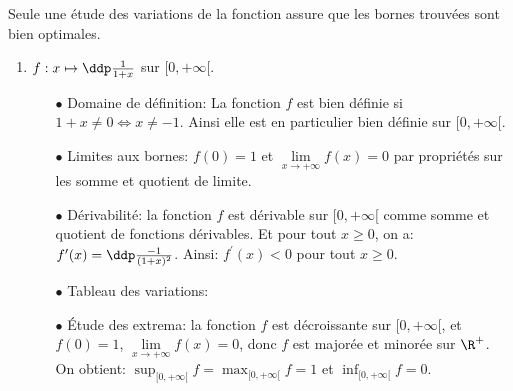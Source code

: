 \begin{correction}  \;
Seule une \'etude des variations de la fonction assure que les bornes trouv\'ees sont bien optimales.
\begin{enumerate}
 \item $f: x\mapsto \ddp\frac{1}{1+x}  $ sur $\lbrack 0,+\infty\lbrack$.
\begin{itemize}
\item[$\bullet$] Domaine de d\'efinition: La fonction $f$ est bien d\'efinie si $1+x\not=0\Leftrightarrow x\not= -1$. Ainsi elle est en particulier bien d\'efinie sur $\lbrack 0,+\infty\lbrack$.
\item[$\bullet$] Limites aux bornes: $f(0)=1$ et $\lim\limits_{x\to +\infty} f(x)=0$ par propri\'et\'es sur les somme et quotient de limite.
\item[$\bullet$] D\'erivabilit\'e: la fonction $f$ est d\'erivable sur $\lbrack 0,+\infty\lbrack$ comme somme et quotient de fonctions d\'erivables. Et pour tout $x\geq 0$, on a: $f^{\prime}(x)=\ddp\frac{-1}{(1+x)^2}$. Ainsi: $f^{\prime}(x)<0$ pour tout $x\geq 0$. 
\item[$\bullet$] Tableau des variations:
\begin{center}
\end{center}
\item[$\bullet$] \'Etude des extrema: la fonction $f$ est d\'ecroissante sur $[0,+\infty[$, et $f(0)=1$, $\lim\limits_{x\to +\infty} f(x)=0$, donc $f$ est major\'ee et minor\'ee sur $\R^+$. On obtient: $\sup_{\lbrack 0,+\infty\lbrack } f=\max_{\lbrack 0,+\infty\lbrack} f=1$ et $\inf_{\lbrack 0,+\infty\lbrack } f=0$.
\end{itemize}

\end{enumerate}
\end{correction}
